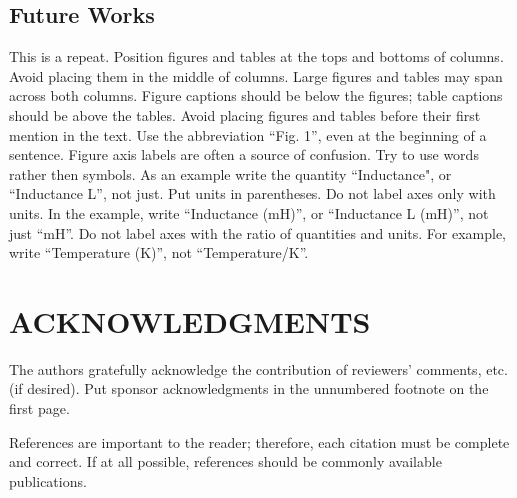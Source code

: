 \documentclass[a4paper, 10pt, conference]{ieeeconf}      %
\begin{document}
\subsection{Future Works}

This is a repeat.
Position figures and tables at the tops and bottoms of columns.
Avoid placing them in the middle of columns. Large figures and tables
may span across both columns. Figure captions should be below the figures;
 table captions should be above the tables. Avoid placing figures and tables
  before their first mention in the text. Use the abbreviation ``Fig. 1'',
  even at the beginning of a sentence.
Figure axis labels are often a source of confusion.
Try to use words rather then symbols. As an example write the quantity ``Inductance",
 or ``Inductance L'', not just.
 Put units in parentheses. Do not label axes only with units.
 In the example, write ``Inductance (mH)'', or ``Inductance L (mH)'', not just ``mH''.
 Do not label axes with the ratio of quantities and units.
 For example, write ``Temperature (K)'', not ``Temperature/K''.
 


\section{ACKNOWLEDGMENTS}

The authors gratefully acknowledge the contribution of reviewers' comments, etc. (if desired). Put sponsor acknowledgments in the unnumbered footnote on the first page.



References are important to the reader; therefore, each citation must be complete and correct. If at all possible, references should be commonly available publications.







\end{document}
